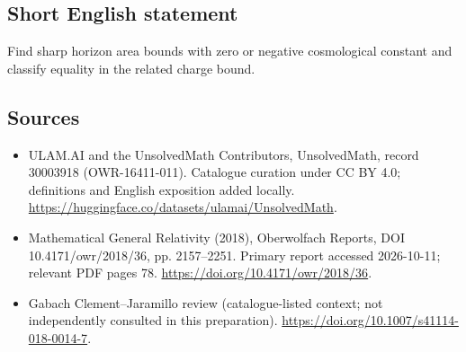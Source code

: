 \documentclass[11pt]{article}
\begin{document}
\subsection{Short English statement}
Find sharp horizon area bounds with zero or negative cosmological constant and classify equality in the related charge bound.
\subsection{Sources}
\begin{itemize}
\item[\hypertarget{source:30003918:1}{S1}] ULAM.AI and the UnsolvedMath Contributors, UnsolvedMath, record 30003918 (OWR-16411-011). Catalogue curation under CC BY 4.0; definitions and English exposition added locally.
\url{https://huggingface.co/datasets/ulamai/UnsolvedMath}.
\item[\hypertarget{source:30003918:2}{S2}] Mathematical General Relativity (2018), Oberwolfach Reports, DOI 10.4171/owr/2018/36, pp. 2157--2251. Primary report accessed 2026-10-11; relevant PDF pages 78.
\url{https://doi.org/10.4171/owr/2018/36}.
\item[\hypertarget{source:30003918:3}{S3}] Gabach Clement--Jaramillo review (catalogue-listed context; not independently consulted in this preparation).
\url{https://doi.org/10.1007/s41114-018-0014-7}.
\end{itemize}
\label{end:30003918}
\end{document}
